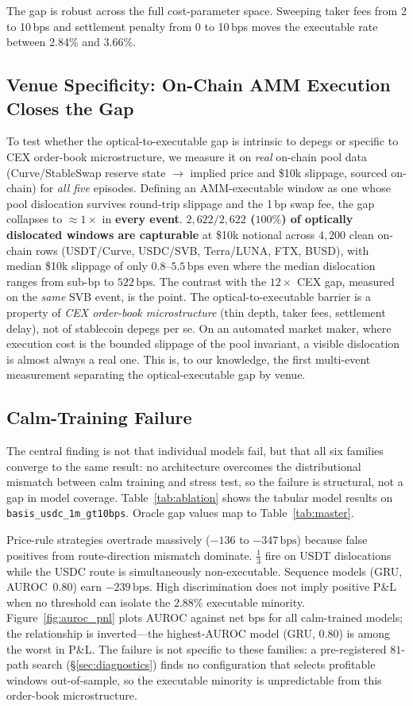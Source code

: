 \documentclass[sigconf,anonymous,natbib=false]{acmart}
\newcommand{\bps}{\,\text{bps}}
\newcommand{\task}[1]{\texttt{\small #1}}
\begin{document}
The gap is robust across the full cost-parameter space. Sweeping
taker fees from 2 to 10\,bps and settlement penalty from 0 to 10\,bps
moves the executable rate between 2.84\% and 3.66\%.

\subsection{Venue Specificity: On-Chain AMM Execution Closes the Gap}
\label{sec:venue}
To test whether the optical-to-executable gap is intrinsic to depegs or specific to
CEX order-book microstructure, we measure it on \emph{real} on-chain pool data
(Curve/StableSwap reserve state $\to$ implied price and \$10k slippage, sourced
on-chain) for \emph{all five} episodes. Defining an AMM-executable window as one
whose pool dislocation survives round-trip slippage and the 1\,bp swap fee, the gap
collapses to $\approx\!1\times$ in \textbf{every event}. \textbf{$2{,}622/2{,}622$
($100\%$) of optically dislocated windows are capturable} at \$10k notional across
$4{,}200$ clean on-chain rows (USDT/Curve, USDC/SVB, Terra/LUNA, FTX, BUSD), with
median \$10k slippage of only $0.8$--$5.5\bps$ even where the median dislocation
ranges from sub-bp to $522\bps$. The contrast with the $12\times$ CEX gap, measured
on the \emph{same} SVB event, is the point. The optical-to-executable barrier is a
property of \emph{CEX order-book microstructure} (thin depth, taker fees, settlement
delay), not of stablecoin depegs per se. On an automated market maker, where
execution cost is the bounded slippage of the pool invariant, a visible dislocation
is almost always a real one. This is, to our knowledge, the first multi-event
measurement separating the optical-executable gap by venue.

\subsection{Calm-Training Failure}
\label{sec:ladder}

The central finding is not that individual models fail, but that all
six families converge to the same result: no architecture overcomes the
distributional mismatch between calm training and stress test, so the
failure is structural, not a gap in model coverage.
Table~\ref{tab:ablation} shows the tabular model results on
\task{basis\_usdc\_1m\_gt10bps}. Oracle gap values map to
Table~\ref{tab:master}.

Price-rule strategies overtrade massively ($-136$ to $-347\bps$) because
false positives from route-direction mismatch dominate. $\frac{1}{3}$ fire on USDT
dislocations while the USDC route is simultaneously non-executable.
Sequence models (GRU, AUROC~0.80) earn $-239\bps$. High discrimination does not
imply positive P\&L when no threshold can isolate the $2.88\%$ executable minority.
Figure~\ref{fig:auroc_pnl} plots AUROC against net bps for all calm-trained models;
the relationship is inverted---the highest-AUROC model (GRU, 0.80) is among the worst
in P\&L. The failure is not specific to these families: a pre-registered $81$-path search
(\S\ref{sec:diagnostics}) finds no configuration that selects profitable windows
out-of-sample, so the executable minority is unpredictable from this order-book
microstructure.
\end{document}
